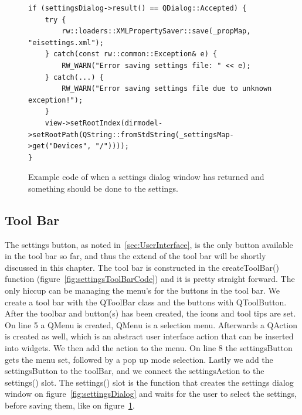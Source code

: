 \begin{figure}[h] %
\centering
\lstset{language=C++} 
\begin{lstlisting}[frame=single]  
if (settingsDialog->result() == QDialog::Accepted) {
	try {
		rw::loaders::XMLPropertySaver::save(_propMap, "eisettings.xml");
	} catch(const rw::common::Exception& e) {
		RW_WARN("Error saving settings file: " << e);
	} catch(...) {
		RW_WARN("Error saving settings file due to unknown exception!");
	}
	view->setRootIndex(dirmodel->setRootPath(QString::fromStdString(_settingsMap->get("Devices", "/")))); 
}
\end{lstlisting}
\caption{Example code of when a settings dialog window has returned and something should be done to the settings.}
\label{fig:settingsCodeReturnDialog} 	
\end{figure}

\subsection{Tool Bar}
\label{sec:ToolBar}
The settings button, as noted in~\ref{sec:UserInterface}, is the only button available in the tool bar so far, and thus the extend of the tool bar will be shortly discussed in this chapter.
The tool bar is constructed in the createToolBar() function (figure~\ref{fig:settingsToolBarCode}) and it is pretty straight forward. The only hiccup can be managing the menu's for the buttons in the tool bar. We create a tool bar with the QToolBar class and the buttons with QToolButton. After the toolbar and button(s) has been created, the icons and tool tips are set. On line 5 a QMenu is created, QMenu is a selection menu. Afterwards a QAction is created as well, which is an abstract user interface action that can be inserted into widgets. We then add the action to the menu. On line 8 the settingsButton gets the menu set, followed by a pop up mode selection. Lastly we add the settingsButton to the toolBar, and we connect the settingsAction to the settings() slot. The settings() slot is the function that creates the settings dialog window on figure~\ref{fig:settingsDialog} and waits for the user to select the settings, before saving them, like on figure~\ref{fig:settingsCodeReturnDialog}.

